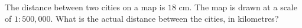 The distance between two cities on a map is $18$ cm. The map is drawn at a scale of $1:500{,}000$. What is the actual distance between the cities, in kilometres?
